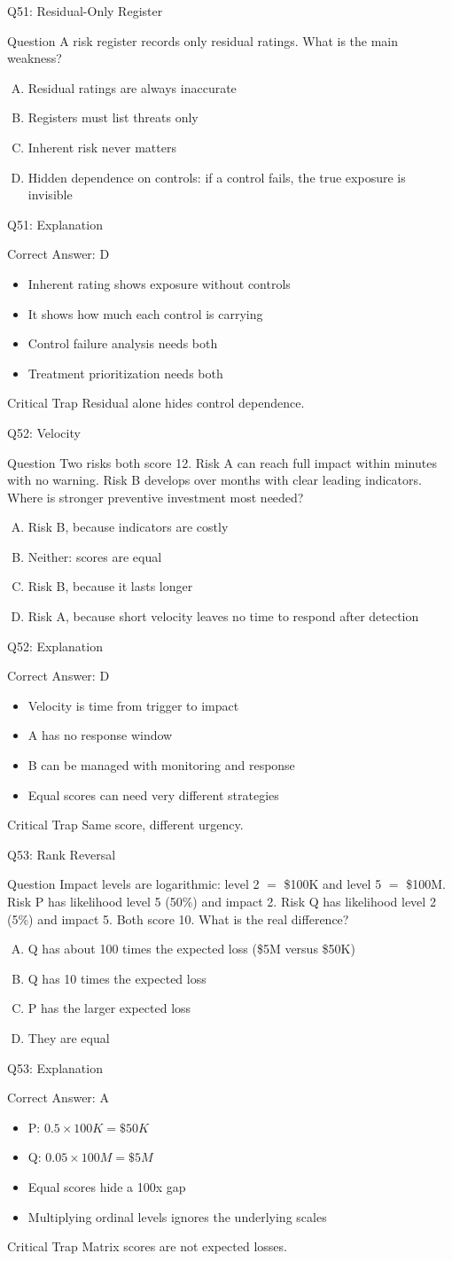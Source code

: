 \documentclass[aspectratio=169]{beamer}
\newcommand{\hq}[7]{%
  \begin{frame}{Q#1: #2}
    \begin{block}{Question}
      #3
    \end{block}
    \begin{enumerate}[(A)]
      #4
    \end{enumerate}
  \end{frame}
  \begin{frame}{Q#1: Explanation}
    \begin{block}{Correct Answer: #5}
      \begin{itemize}
        #6
      \end{itemize}
    \end{block}
    \begin{alertblock}{Critical Trap}
      #7
    \end{alertblock}
  \end{frame}
}
\begin{document}
\hq{51}{Residual-Only Register}
{A risk register records only residual ratings. What is the main weakness?}
{\item Residual ratings are always inaccurate
 \item Registers must list threats only
 \item Inherent risk never matters
 \item Hidden dependence on controls: if a control fails, the true exposure is invisible}
{D}
{\item Inherent rating shows exposure without controls
 \item It shows how much each control is carrying
 \item Control failure analysis needs both
 \item Treatment prioritization needs both}
{Residual alone hides control dependence.}

\hq{52}{Velocity}
{Two risks both score 12. Risk A can reach full impact within minutes with no warning. Risk B develops over months with clear leading indicators. Where is stronger preventive investment most needed?}
{\item Risk B, because indicators are costly
 \item Neither: scores are equal
 \item Risk B, because it lasts longer
 \item Risk A, because short velocity leaves no time to respond after detection}
{D}
{\item Velocity is time from trigger to impact
 \item A has no response window
 \item B can be managed with monitoring and response
 \item Equal scores can need very different strategies}
{Same score, different urgency.}

\hq{53}{Rank Reversal}
{Impact levels are logarithmic: level 2 $=$ \$100K and level 5 $=$ \$100M. Risk P has likelihood level 5 (50\%) and impact 2. Risk Q has likelihood level 2 (5\%) and impact 5. Both score 10. What is the real difference?}
{\item Q has about 100 times the expected loss (\$5M versus \$50K)
 \item Q has 10 times the expected loss
 \item P has the larger expected loss
 \item They are equal}
{A}
{\item P: $0.5 \times 100K = \$50K$
 \item Q: $0.05 \times 100M = \$5M$
 \item Equal scores hide a 100x gap
 \item Multiplying ordinal levels ignores the underlying scales}
{Matrix scores are not expected losses.}
\end{document}
